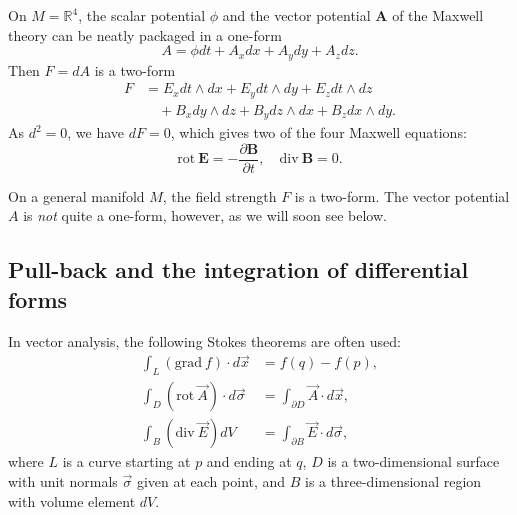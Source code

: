 \documentclass[12pt]{article}
\numberwithin{equation}{section}
\numberwithin{figure}{section}
\theoremstyle{remark}
\def\bR{\mathbb{R}}
\begin{document}
On $M=\bR^4$,
the scalar potential $\phi$ and the vector potential $\mathbf{A}$ of the Maxwell theory
can be neatly packaged in a one-form \begin{equation}
A = \phi dt + A_x dx + A_y dy + A_z dz.
\end{equation}
Then $F=dA$ is a two-form \begin{equation}
  \begin{aligned}
  F &= 
 E_x dt\wedge dx + E_y dt\wedge dy + E_z dt\wedge dz \\
&\quad + B_x dy\wedge dz + B_y dz\wedge dx + B_z dx\wedge dy .
\end{aligned}
\end{equation}
As $d^2=0$, we have $dF=0$, which gives two of the four Maxwell equations:
\begin{equation}
\mathrm{rot}\ \mathbf{E} = -\frac{\partial \mathbf{B}}{\partial t},\quad
\mathrm{div}\ \mathbf{B} = 0.
\end{equation}

On a general manifold $M$, the field strength $F$ is a two-form.
The vector potential $A$ is \emph{not} quite a one-form, however,
as we will soon see below.

\subsection{Pull-back and the integration of differential forms}

In vector analysis, the following Stokes theorems are often used:
\begin{align}
\int_L (\mathrm{grad}\ f) \cdot d\vec x &= f(q)-f(p), \label{eq:grad-stokes}\\
\int_D (\mathrm{rot}\ \vec A) \cdot d\vec \sigma &= \int_{\partial D} \vec A \cdot d\vec x, \label{eq:rot-stokes}\\
\int_B (\mathrm{div}\ \vec E) dV &= \int_{\partial B} \vec E \cdot d\vec \sigma,\label{eq:div-stokes}
\end{align}
where $L$ is a curve starting at $p$ and ending at $q$,
$D$ is a two-dimensional surface with unit normals $\vec \sigma$ given at each point,
and $B$ is a three-dimensional region with volume element $dV$.
\end{document}
